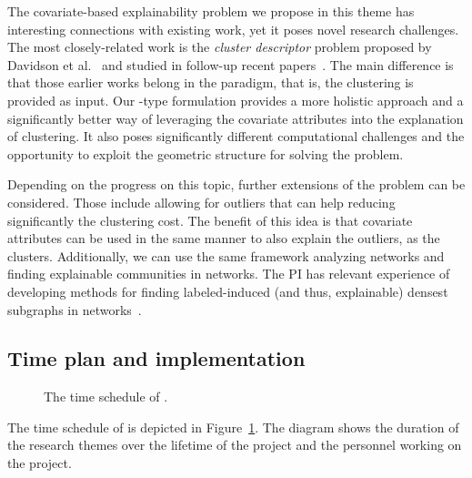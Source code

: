 \documentclass[a4paper,11pt]{article}
\begin{document}
The covariate-based explainability problem we propose in this theme
has interesting connections with existing work, yet it poses novel research challenges.
The most closely-related work is the \emph{cluster descriptor} problem
proposed by Davidson et al.~\cite{davidson2018cluster} 
and studied in follow-up recent papers~\citep{sambaturu2020efficient}.
The main difference is that those earlier works belong in the \posthoc paradigm, 
that is, the clustering is provided as input. 
Our \joint-type formulation provides a more holistic approach and a
significantly better way of leveraging the covariate attributes into the explanation of clustering. 
It also poses significantly different computational challenges
and the opportunity to exploit the geometric structure for solving the problem.

Depending on the progress on this topic, further extensions of the problem can be considered. 
Those include allowing for outliers that can help reducing significantly the clustering cost.
The benefit of this idea is that covariate attributes can be used in the same manner
to also explain the outliers, as the clusters.
Additionally, we can use the same framework analyzing networks and finding 
explainable communities in networks.
The PI has relevant experience of developing methods for finding labeled-induced
(and thus, explainable) densest subgraphs in networks~\cite{galbrun2014overlapping,galbrun2016top}.

\subsection{Time plan and implementation}


\begin{figure}[t]
\begin{center}
\vspace{-2mm}
{\small}
\end{center}
\vspace{-6mm}
\caption{\label{figure:gantt}The time schedule of {\acronym}.}
\vspace{-2mm}
\end{figure}

The time schedule of \acronym is depicted in Figure~\ref{figure:gantt}. 
The diagram shows the duration of the research themes over the lifetime of the project
and the personnel working on the project.
\end{document}
